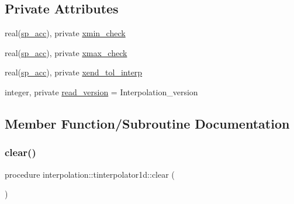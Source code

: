 \subsection*{Private Attributes}
\begin{DoxyCompactItemize}
\item 
real(\mbox{\hyperlink{namespaceinterpolation_af72aa9a05feb8ef90b2d26e4a013abf3}{sp\+\_\+acc}}), private \mbox{\hyperlink{structinterpolation_1_1tinterpolator1d_a16eb5d297adcaeef8c35603f9b4e7ff1}{xmin\+\_\+check}}
\item 
real(\mbox{\hyperlink{namespaceinterpolation_af72aa9a05feb8ef90b2d26e4a013abf3}{sp\+\_\+acc}}), private \mbox{\hyperlink{structinterpolation_1_1tinterpolator1d_a6b80c4f338a55a46a5db056a34eff99b}{xmax\+\_\+check}}
\item 
real(\mbox{\hyperlink{namespaceinterpolation_af72aa9a05feb8ef90b2d26e4a013abf3}{sp\+\_\+acc}}), private \mbox{\hyperlink{structinterpolation_1_1tinterpolator1d_a776cfd3e7443d53bb727d640d4164ff0}{xend\+\_\+tol\+\_\+interp}}
\item 
integer, private \mbox{\hyperlink{structinterpolation_1_1tinterpolator1d_af5f033f653cea315a7e53cd8cb748845}{read\+\_\+version}} = Interpolation\+\_\+version
\end{DoxyCompactItemize}


\subsection{Member Function/\+Subroutine Documentation}
\mbox{\label{structinterpolation_1_1tinterpolator1d_aa58f19807ce210a1d45d3c3a56ee2633}} 
\subsubsection{\texorpdfstring{clear()}{clear()}}
{\footnotesize\ttfamily procedure interpolation\+::tinterpolator1d\+::clear (\begin{DoxyParamCaption}{ }\end{DoxyParamCaption})}

\mbox{\label{structinterpolation_1_1tinterpolator1d_a0cdf6e011498f0534bf443bf2fbfb3dd}} 
